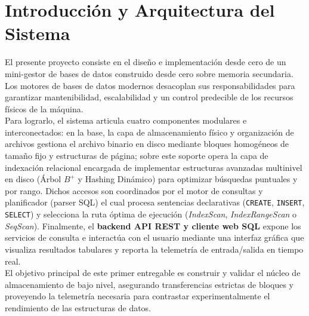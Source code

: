 \documentclass[a4paper,12pt]{article}
\begin{document}
\tableofcontents
\newpage

\setcounter{page}{1}


\section{Introducción y Arquitectura del Sistema}
El presente proyecto consiste en el diseño e implementación desde cero de un mini-gestor de bases de datos construido desde cero sobre memoria secundaria. Los motores de bases de datos modernos desacoplan sus responsabilidades para garantizar mantenibilidad, escalabilidad y un control predecible de los recursos físicos de la máquina.\\

Para lograrlo, el sistema articula cuatro componentes modulares e interconectados: en la base, la capa de almacenamiento físico y organización de archivos gestiona el archivo binario en disco mediante bloques homogéneos de tamaño fijo y estructuras de página; sobre este soporte opera la capa de indexación relacional encargada de implementar estructuras avanzadas multinivel en disco (Árbol $B^+$ y Hashing Dinámico) para optimizar búsquedas puntuales y por rango. Dichos accesos son coordinados por el motor de consultas y planificador (parser SQL) el cual procesa sentencias declarativas (\texttt{CREATE}, \texttt{INSERT}, \texttt{SELECT}) y selecciona la ruta óptima de ejecución (\textit{IndexScan}, \textit{IndexRangeScan} o \textit{SeqScan}). Finalmente, el \textbf{backend API REST y cliente web SQL} expone los servicios de consulta e interactúa con el usuario mediante una interfaz gráfica que visualiza resultados tabulares y reporta la telemetría de entrada/salida en tiempo real.\\

El objetivo principal de este primer entregable es construir y validar el núcleo de almacenamiento de bajo nivel, asegurando transferencias estrictas de bloques y proveyendo la telemetría necesaria para contrastar experimentalmente el rendimiento de las estructuras de datos.
\end{document}
